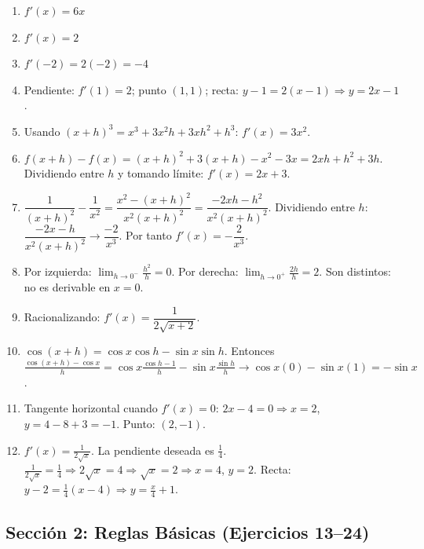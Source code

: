 \documentclass[12pt, letterpaper]{article}
\begin{document}
\begin{enumerate}[series=respuestas, leftmargin=*, label=\textbf{\arabic*.}]
  \item $f'(x) = 6x$
  \item $f'(x) = 2$
  \item $f'(-2) = 2(-2) = -4$
  \item Pendiente: $f'(1) = 2$; punto $(1,1)$; recta: $y - 1 = 2(x - 1) \Rightarrow y = 2x - 1$.
  \item Usando $(x+h)^3 = x^3 + 3x^2h + 3xh^2 + h^3$: $f'(x) = 3x^2$.
  \item $f(x+h) - f(x) = (x+h)^2 + 3(x+h) - x^2 - 3x = 2xh + h^2 + 3h$. Dividiendo entre $h$ y tomando límite: $f'(x) = 2x + 3$.
  \item $\dfrac{1}{(x+h)^2} - \dfrac{1}{x^2} = \dfrac{x^2 - (x+h)^2}{x^2(x+h)^2} = \dfrac{-2xh - h^2}{x^2(x+h)^2}$. Dividiendo entre $h$: $\dfrac{-2x - h}{x^2(x+h)^2} \to \dfrac{-2}{x^3}$. Por tanto $f'(x) = -\dfrac{2}{x^3}$.
  \item Por izquierda: $\lim_{h\to 0^-} \frac{h^2}{h} = 0$. Por derecha: $\lim_{h\to 0^+} \frac{2h}{h} = 2$. Son distintos: no es derivable en $x=0$.
  \item Racionalizando: $f'(x) = \dfrac{1}{2\sqrt{x+2}}$.
  \item $\cos(x+h) = \cos x \cos h - \sin x \sin h$. Entonces $\frac{\cos(x+h) - \cos x}{h} = \cos x \frac{\cos h - 1}{h} - \sin x \frac{\sin h}{h} \to \cos x(0) - \sin x(1) = -\sin x$.
  \item Tangente horizontal cuando $f'(x) = 0$: $2x - 4 = 0 \Rightarrow x = 2$, $y = 4 - 8 + 3 = -1$. Punto: $(2, -1)$.
  \item $f'(x) = \frac{1}{2\sqrt{x}}$. La pendiente deseada es $\frac{1}{4}$. $\frac{1}{2\sqrt{x}} = \frac{1}{4} \Rightarrow 2\sqrt{x} = 4 \Rightarrow \sqrt{x} = 2 \Rightarrow x = 4$, $y = 2$. Recta: $y - 2 = \frac{1}{4}(x - 4) \Rightarrow y = \frac{x}{4} + 1$.
\end{enumerate}


\subsection*{Sección 2: Reglas Básicas (Ejercicios 13--24)}
\end{document}
